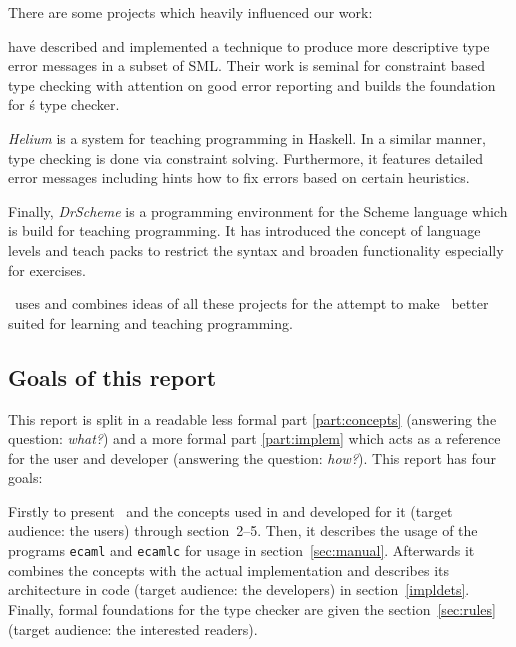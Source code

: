 There are some projects which heavily influenced our work:

\citet{haackwells04} have described and implemented a technique 
to produce more descriptive type error messages in a subset of SML.  
Their work is seminal for constraint based type checking with attention 
on good error reporting and builds the foundation for \easyocaml\'s type 
checker.

\emph{Helium} \citep{helium-hw03} is a system for teaching programming 
in Haskell. In a similar manner, type checking is done via constraint 
solving. Furthermore, it features detailed error messages including 
hints how to fix errors based on certain heuristics.

Finally, \emph{DrScheme} \citep{Felleisen98thedrscheme} is a programming 
environment for the Scheme language which is build for teaching 
programming.  It has introduced the concept of language levels and teach 
packs to restrict the syntax and broaden functionality especially for 
exercises.

\easyocaml\ uses and combines ideas of all these projects for the attempt to
make \ocaml\ better suited for learning and teaching programming. \more


\subsection*{Goals of this report}

This report is split in a readable less formal part \ref{part:concepts}
(answering the question: \emph{what?}) and a more formal part \ref{part:implem}
which acts as a reference for the user and developer (answering the question:
\emph{how?}).  This report has four goals:

Firstly to present \easyocaml\ and the concepts used in and developed for it
(target audience: the users) through section~2--5.
Then, it describes the usage of the programs \texttt{ecaml} and \texttt{ecamlc}
for usage in section~\ref{sec:manual}.
Afterwards it combines the concepts with the actual implementation and
describes its architecture in code (target audience: the developers) in
section~\ref{impldets}.
Finally, formal foundations for the type checker are given the section~\ref{sec:rules} (target
audience: the interested readers).
